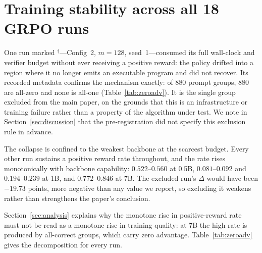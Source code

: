 \section{Training stability across all 18 GRPO runs}
\label{app:stability}



\noindent
One run marked $^{\dagger}$---Config~2, $m{=}128$, seed~1---consumed its full
wall-clock and verifier budget without ever receiving a positive reward: the
policy drifted into a region where it no longer emits an executable program and
did not recover. Its recorded metadata confirms the mechanism exactly: of 880
prompt groups, 880 are all-zero and none is all-one
(Table~\ref{tab:zeroadv}). It is the single group excluded from the main paper,
on the grounds that this is an infrastructure or training failure rather than a
property of the algorithm under test. We note in Section~\ref{sec:discussion}
that the pre-registration did not specify this exclusion rule in advance.

The collapse is confined to the weakest backbone at the scarcest budget. Every
other run sustains a positive reward rate throughout, and the rate rises
monotonically with backbone capability: $0.522$--$0.560$ at 0.5B,
$0.081$--$0.092$ and $0.194$--$0.239$ at 1B, and $0.772$--$0.846$ at 7B. The
excluded run's $\Delta$ would have been $-19.73$ points, more negative than any
value we report, so excluding it weakens rather than strengthens the paper's
conclusion.

Section~\ref{sec:analysis} explains why the monotone rise in positive-reward
rate must not be read as a monotone rise in training quality: at 7B the high
rate is produced by all-correct groups, which carry zero advantage.
Table~\ref{tab:zeroadv} gives the decomposition for every run.
